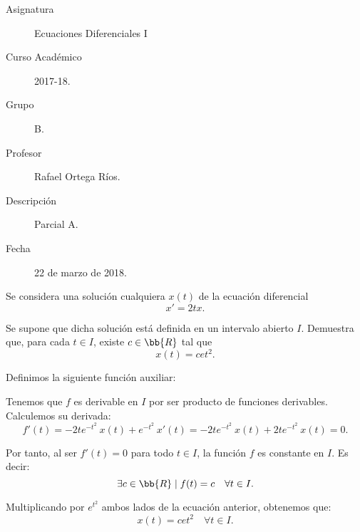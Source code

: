 \documentclass[12pt]{article}
\begin{document}

    
    

    \begin{description}
        \item[Asignatura] Ecuaciones Diferenciales I
        \item[Curso Académico] 2017-18.
        \item[Grupo] B.
        \item[Profesor] Rafael Ortega Ríos.
        \item[Descripción] Parcial A.
        \item[Fecha] 22 de marzo de 2018.
    
    \end{description}
    \newpage
    
\begin{ejercicio}
    Se considera una solución cualquiera \(x(t)\) de la ecuación diferencial
    \[
        x' = 2tx.
    \]

    Se supone que dicha solución está definida en un intervalo abierto \(I\). Demuestra que, para cada $t\in I$, existe \(c \in \bb{R}\) tal que
    \[
        x(t) = cet^2.
    \]

    Definimos la siguiente función auxiliar:

    Tenemos que \(f\) es derivable en \(I\) por ser producto de funciones derivables. Calculemos su derivada:
    \begin{equation*}
        f'(t) = -2te^{-t^2}~x(t) + e^{-t^2}~x'(t) = -2te^{-t^2}~x(t) + 2te^{-t^2}~x(t) = 0.
    \end{equation*}

    Por tanto, al ser $f'(t)=0$ para todo \(t\in I\), la función \(f\) es constante en \(I\). Es decir:
    \begin{equation*}
        \exists c \in \bb{R} \mid f(t) = c \quad \forall t \in I.
    \end{equation*}

    Multiplicando por $e^{t^2}$ ambos lados de la ecuación anterior, obtenemos que:
    \begin{equation*}
        x(t) = cet^2 \quad \forall t \in I.
    \end{equation*}
\end{ejercicio}
\end{document}
